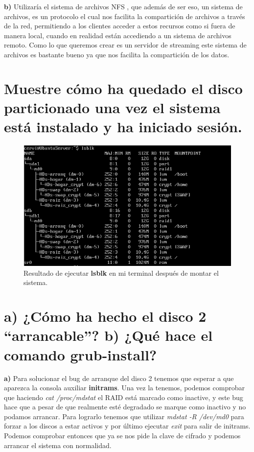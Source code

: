 \textbf{b)} Utilizaría el sistema de archivos NFS \cite{NFS}, que además de ser eso, un sistema de archivos, es un protocolo el cual nos facilita la compartición de archivos a través de la red, permitiendo a los clientes acceder a estos recursos como si fuera de manera local, cuando en realidad están accediendo a un sistema de archivos remoto. Como lo que queremos crear es un servidor de streaming este sistema de archivos es bastante bueno ya que nos facilita la compartición de los datos.

\section{Muestre cómo ha quedado el disco particionado una vez el sistema está instalado y ha iniciado sesión.}

\begin{figure}[H]
	\centering
	\includegraphics[scale=0.75]{lsblk.png}
	\caption{Resultado de ejecutar \textbf{lsblk} en mi terminal después de montar el sistema. \label{fig:figura1}}
\end{figure}


\section{a) ¿Cómo ha hecho el disco 2 ``arrancable''? \newline b) ¿Qué hace el comando grub-install?}
\textbf{a)} Para solucionar el bug de arranque del disco 2 tenemos que esperar a que aparezca la consola auxiliar \textbf{initrams}. Una vez la tenemos, podemos comprobar que haciendo \textit{cat /proc/mdstat} el RAID está marcado como inactive, y este bug hace que a pesar de que realmente esté degradado se marque como inactivo y no podamos arrancar. Para lograrlo tenemos que utilizar \textit{mdstat -R /dev/md0} para forzar a los discos a estar activos y por último ejecutar \textit{exit} para salir de initrams. Podemos comprobar entonces que ya se nos pide la clave de cifrado y podemos arrancar el sistema con normalidad. \\

